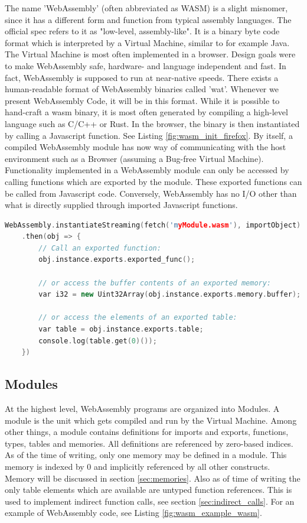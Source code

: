 \documentclass[sigconf]{acmart}
\begin{document}
The name 'WebAssembly' (often abbreviated as WASM) is a slight misnomer, since it has a different form and function from typical assembly languages. The official spec refers to it as "low-level, assembly-like". It is a binary byte code format which is interpreted by a Virtual Machine, similar to for example Java. The Virtual Machine is most often implemented in a browser. Design goals were to make WebAssembly safe, hardware- and language independent and fast. In fact, WebAssembly is supposed to run at near-native speeds. There exists a human-readable format of WebAssembly binaries called 'wat'. Whenever we present WebAssembly Code, it will be in this format. While it is possible to hand-craft a wasm binary, it is most often generated by compiling a high-level language such as C/C++ or Rust. In the browser, the binary is then instantiated by calling a Javascript function. See Listing \ref{fig:wasm_init_firefox}. By itself, a compiled WebAssembly module has now way of communicating with the host environment such as a Browser (assuming a Bug-free Virtual Machine). Functionality implemented in a WebAssembly module can only be accessed by calling functions which are exported by the module. These exported functions can be called from Javascript code. Conversely, WebAssembly has no I/O other than what is directly supplied through imported Javascript functions. 

\begin{lstlisting}[language=C++, caption={How to intantiate a WebAssembly module using Javascript. (\url{https://developer.mozilla.org/en-US/docs/WebAssembly/Loading_and_running}).}, label=fig:wasm_example_c]
	WebAssembly.instantiateStreaming(fetch('myModule.wasm'), importObject)
	.then(obj => {
		// Call an exported function:
		obj.instance.exports.exported_func();

		// or access the buffer contents of an exported memory:
		var i32 = new Uint32Array(obj.instance.exports.memory.buffer);

		// or access the elements of an exported table:
 		var table = obj.instance.exports.table;
		console.log(table.get(0)());
	})
\end{lstlisting}

\subsection{Modules}
At the highest level, WebAssembly programs are organized into Modules.  A module is the unit which gets compiled and run by the Virtual Machine. Among other things, a module contains definitions for imports and exports, functions, types, tables and memories. All definitions are referenced by zero-based indices. As of the time of writing, only one memory may be defined in a module. This memory is indexed by 0 and implicitly referenced by all other constructs. Memory will be discussed in section \ref{sec:memories}. Also as of time of writing the only table elements which are available are untyped function references. This is used to implement indirect function calls, see section \ref{sec:indirect_calls}. For an example of WebAssembly code, see Listing \ref{fig:wasm_example_wasm}.
\end{document}
